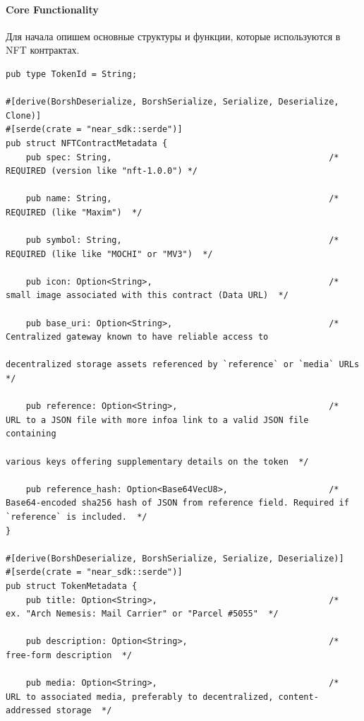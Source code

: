 \paragraph{Core Functionality}

Для начала опишем основные структуры и функции\cite{corestandard}, которые используются в NFT контрактах.

\begin{verbatim}
pub type TokenId = String;

#[derive(BorshDeserialize, BorshSerialize, Serialize, Deserialize, Clone)]
#[serde(crate = "near_sdk::serde")]
pub struct NFTContractMetadata {
    pub spec: String,                                           /*  REQUIRED (version like "nft-1.0.0") */

    pub name: String,                                           /*  REQUIRED (like "Maxim")  */

    pub symbol: String,                                         /*  REQUIRED (like like "MOCHI" or "MV3")  */

    pub icon: Option<String>,                                   /*  small image associated with this contract (Data URL)  */

    pub base_uri: Option<String>,                               /*  Centralized gateway known to have reliable access to
                                                                    decentralized storage assets referenced by `reference` or `media` URLs  */

    pub reference: Option<String>,                              /*  URL to a JSON file with more infoa link to a valid JSON file containing
                                                                    various keys offering supplementary details on the token  */

    pub reference_hash: Option<Base64VecU8>,                    /*  Base64-encoded sha256 hash of JSON from reference field. Required if `reference` is included.  */
}

#[derive(BorshDeserialize, BorshSerialize, Serialize, Deserialize)]
#[serde(crate = "near_sdk::serde")]
pub struct TokenMetadata {
    pub title: Option<String>,                                  /*  ex. "Arch Nemesis: Mail Carrier" or "Parcel #5055"  */

    pub description: Option<String>,                            /*  free-form description  */

    pub media: Option<String>,                                  /*  URL to associated media, preferably to decentralized, content-addressed storage  */


\end{verbatim}
